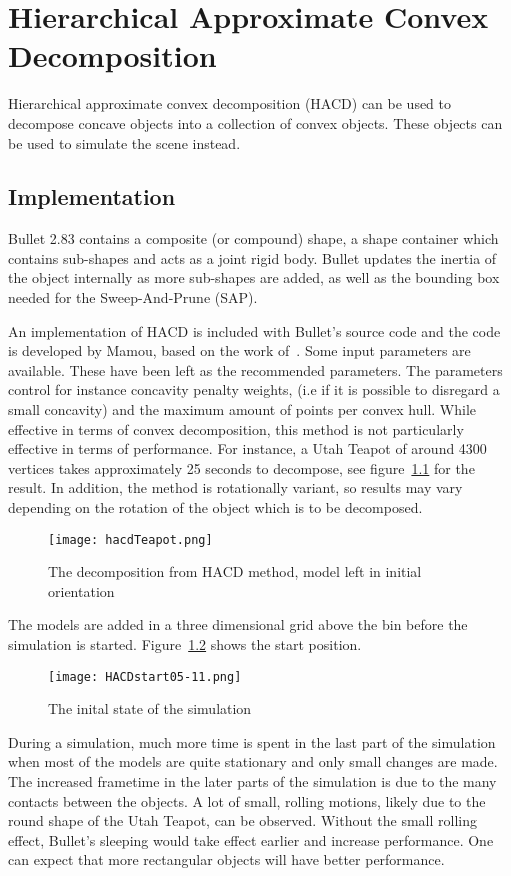 \chapter{Hierarchical Approximate Convex Decomposition}\label{sec:hacd}
Hierarchical approximate convex decomposition (HACD) can be used to decompose
concave objects into a collection of convex objects. These objects can be used
to simulate the scene instead.
\section{Implementation}
Bullet 2.83 contains a
composite (or compound) shape, a shape container which contains sub-shapes and acts
as a joint rigid body. Bullet updates the inertia of the object internally as
more sub-shapes are added, as well as the bounding box needed for the Sweep-And-Prune (SAP).

An implementation of HACD is included with Bullet's source code and the code is
developed by Mamou, based on the work of~\cite{mamou}. Some input parameters are available. These have been
left as the recommended parameters. The parameters control for instance concavity
penalty weights, (i.e if it is possible to disregard a small concavity)
and the maximum amount of points per convex hull.
While effective in terms of convex decomposition, this method is not particularly
effective in terms of performance. For instance, a Utah Teapot of around 4300 vertices
takes approximately 25 seconds to decompose, see figure~\ref{fig:HACD} for the result. In addition, the method is rotationally
 variant, so results may vary depending on the rotation of the object which is to be decomposed.

 \begin{figure}[H]
   \centering
   \texttt{[image: hacdTeapot.png]}
   \caption{The decomposition from HACD method, model left in initial orientation}
   \label{fig:HACD}
 \end{figure}

The models are added in a three dimensional grid above the bin before the simulation
is started. Figure~\ref{fig:hacdStart} shows the start position.

\begin{figure}[H]
  \centering
  \texttt{[image: HACDstart05-11.png]}
  \caption{The inital state of the simulation}
  \label{fig:hacdStart}
\end{figure}

During a simulation, much more time is spent in the last
part of the simulation when most of the models are quite stationary and only small
changes are made. The increased frametime in the later parts of the simulation is
due to the many contacts between the objects. A lot of small, rolling motions, likely due to the round
shape of the Utah Teapot, can be observed. Without the small rolling effect, Bullet's
sleeping would take effect earlier and increase performance. One can expect that
more rectangular objects will have better performance.

